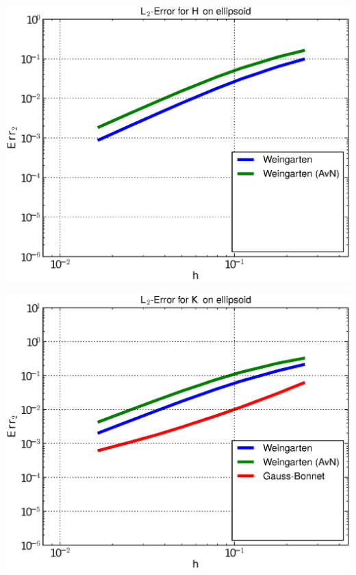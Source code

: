 \documentclass{beamer}
\begin{document}
\begin{frame}
\begin{overprint}
\begin{minipage}[t]{0.49\textwidth}
            \centering\includegraphics[width=\textwidth]{bilder/Curvature/heineC/ErrHL2_2.eps}
          \end{minipage}
          \begin{minipage}[t]{0.49\textwidth}
            \centering\includegraphics[width=\textwidth]{bilder/Curvature/heineC/ErrKL2_3.eps}
          \end{minipage}\hfill
          \begin{minipage}[t]{0.49\textwidth}

\end{minipage}
\end{overprint}
\end{frame}
\end{document}
